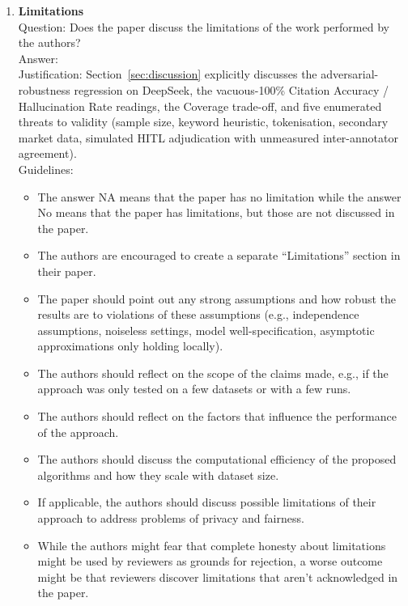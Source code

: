 \documentclass{article}
\begin{document}
\begin{enumerate}
\item {\bf Limitations}\\
Question: Does the paper discuss the limitations of the work performed by the authors?\\
Answer: \answerYes{}\\
Justification: Section~\ref{sec:discussion} explicitly discusses the adversarial-robustness regression on DeepSeek, the vacuous-100\% Citation Accuracy / Hallucination Rate readings, the Coverage trade-off, and five enumerated threats to validity (sample size, keyword heuristic, tokenisation, secondary market data, simulated HITL adjudication with unmeasured inter-annotator agreement).\\
Guidelines:
\begin{itemize}
\item The answer NA means that the paper has no limitation while the answer No means that the paper has limitations, but those are not discussed in the paper.
\item The authors are encouraged to create a separate ``Limitations'' section in their paper.
\item The paper should point out any strong assumptions and how robust the results are to violations of these assumptions (e.g., independence assumptions, noiseless settings, model well-specification, asymptotic approximations only holding locally).
\item The authors should reflect on the scope of the claims made, e.g., if the approach was only tested on a few datasets or with a few runs.
\item The authors should reflect on the factors that influence the performance of the approach.
\item The authors should discuss the computational efficiency of the proposed algorithms and how they scale with dataset size.
\item If applicable, the authors should discuss possible limitations of their approach to address problems of privacy and fairness.
\item While the authors might fear that complete honesty about limitations might be used by reviewers as grounds for rejection, a worse outcome might be that reviewers discover limitations that aren't acknowledged in the paper.
\end{itemize}


\end{enumerate}
\end{document}
